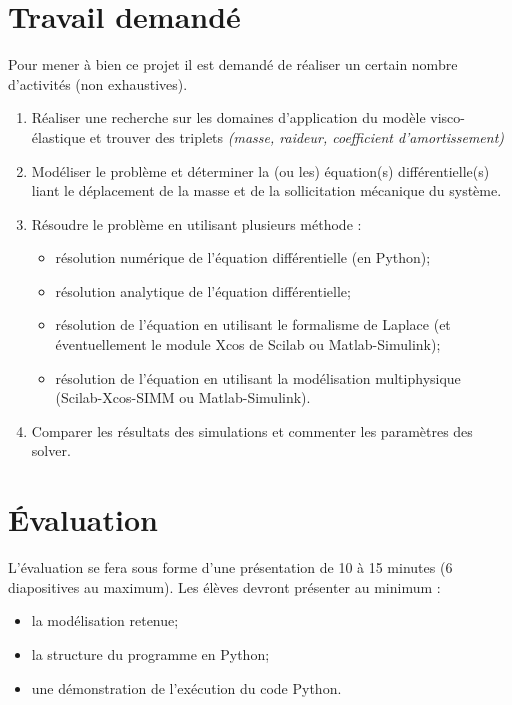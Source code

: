 \documentclass[10pt,fleqn]{article} %
\begin{document}
\section{Travail demandé}
Pour mener à bien ce projet il est demandé de réaliser un certain nombre d'activités (non exhaustives).
\begin{enumerate}
\item Réaliser une recherche sur les domaines d'application du modèle visco-élastique et trouver des triplets \textit{(masse, raideur, coefficient d'amortissement)}
\item Modéliser le problème et déterminer la (ou les) équation(s) différentielle(s) liant le déplacement de la masse et de la sollicitation mécanique du système.
\item Résoudre le problème en utilisant plusieurs méthode : 
\begin{itemize}
\item résolution numérique de l'équation différentielle (en Python);
\item résolution analytique de l'équation différentielle;
\item résolution de l'équation en utilisant le formalisme de Laplace (et éventuellement le module Xcos de Scilab ou Matlab-Simulink);
\item résolution de l'équation en utilisant la modélisation multiphysique (Scilab-Xcos-SIMM ou Matlab-Simulink).
\end{itemize}
\item Comparer les résultats des simulations et commenter les paramètres des solver.
\end{enumerate}

\section{Évaluation}
L'évaluation se fera sous forme d'une présentation de 10 à 15 minutes (6 diapositives au maximum). Les élèves devront présenter au minimum : 
\begin{itemize}
\item la modélisation retenue;
\item la structure du programme en Python;
\item une démonstration de l'exécution du code Python.
\end{itemize}



\ifprof
\newpage
\end{document}
